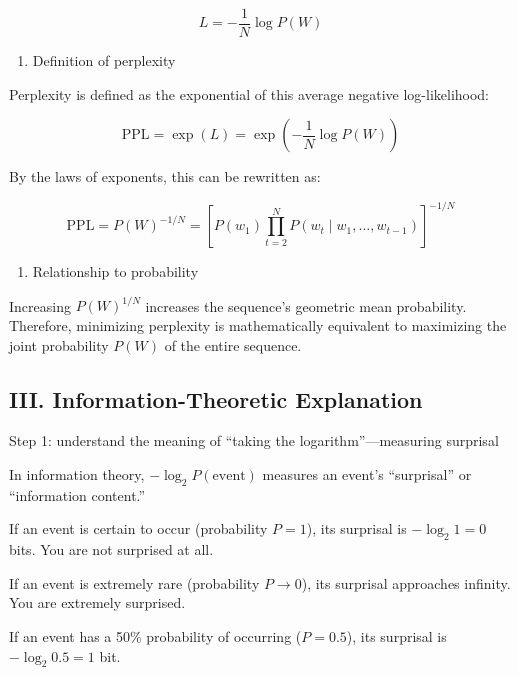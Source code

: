\[
L=-\frac{1}{N}\log P(W)
\]

\begin{enumerate}
\def\labelenumi{\arabic{enumi}.}
\setcounter{enumi}{4}
\tightlist
\item
  Definition of perplexity
\end{enumerate}

Perplexity is defined as the exponential of this average negative log-likelihood:

\[
\mathrm{PPL}=\exp(L)=\exp\left(-\frac{1}{N}\log P(W)\right)
\]

By the laws of exponents, this can be rewritten as:

\[
\mathrm{PPL}=P(W)^{-1/N}
=\left[P(w_1)\prod_{t=2}^{N}P(w_t\mid w_1,\ldots,w_{t-1})\right]^{-1/N}
\]

\begin{enumerate}
\def\labelenumi{\arabic{enumi}.}
\setcounter{enumi}{5}
\tightlist
\item
  Relationship to probability
\end{enumerate}

Increasing \(P(W)^{1/N}\) increases the sequence's geometric mean probability. Therefore, minimizing perplexity is mathematically equivalent to maximizing the joint probability \(P(W)\) of the entire sequence.

\hypertarget{iii.-information-theoretic-explanation}{%
\subsection{III. Information-Theoretic Explanation}\label{iii.-information-theoretic-explanation}}

Step 1: understand the meaning of ``taking the logarithm''---measuring surprisal

In information theory, \(-\log_2 P(\mathrm{event})\) measures an event's ``surprisal'' or ``information content.''

If an event is certain to occur (probability \(P=1\)), its surprisal is \(-\log_2 1=0\) bits. You are not surprised at all.

If an event is extremely rare (probability \(P\to 0\)), its surprisal approaches infinity. You are extremely surprised.

If an event has a 50\% probability of occurring (\(P=0.5\)), its surprisal is \(-\log_2 0.5=1\) bit.

